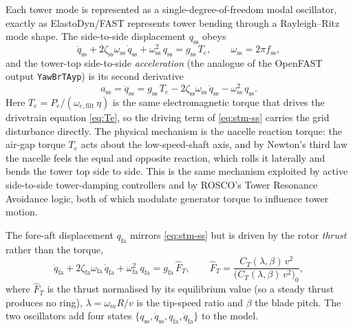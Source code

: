 Each tower mode is represented as a single-degree-of-freedom modal oscillator,
exactly as ElastoDyn/FAST represents tower bending through a Rayleigh--Ritz mode
shape. The side-to-side displacement \(q_{\mathrm{ss}}\) obeys
\begin{equation}
  \ddot{q}_{\mathrm{ss}}
    + 2\zeta_{\mathrm{ss}}\omega_{\mathrm{ss}}\,\dot{q}_{\mathrm{ss}}
    + \omega_{\mathrm{ss}}^2\,q_{\mathrm{ss}}
  = g_{\mathrm{ss}}\,T_e,
  \qquad \omega_{\mathrm{ss}} = 2\pi f_{\mathrm{ss}},
  \label{eq:stm-ss}
\end{equation}
and the tower-top side-to-side \emph{acceleration} (the analogue of the OpenFAST
output \texttt{YawBrTAyp}) is its second derivative
\begin{equation}
  a_{\mathrm{ss}} = \ddot{q}_{\mathrm{ss}}
    = g_{\mathrm{ss}}\,T_e
      - 2\zeta_{\mathrm{ss}}\omega_{\mathrm{ss}}\,\dot{q}_{\mathrm{ss}}
      - \omega_{\mathrm{ss}}^2\,q_{\mathrm{ss}}.
  \label{eq:stm-ss-accel}
\end{equation}
Here \(T_e = P_e/(\omega_{e,\mathrm{filt}}\,\eta)\) is the same electromagnetic
torque that drives the drivetrain equation \eqref{eq:Te}, so the driving term of
\eqref{eq:stm-ss} carries the grid disturbance directly. The physical mechanism
is the nacelle reaction torque: the air-gap torque \(T_e\) acts about the
low-speed-shaft axis, and by Newton's third law the nacelle feels the equal and
opposite reaction, which rolls it laterally and bends the tower top side to side.
This is the same mechanism exploited by active side-to-side tower-damping
controllers and by ROSCO's Tower Resonance Avoidance logic, both of which
modulate generator torque to influence tower motion.

The fore-aft displacement \(q_{\mathrm{fa}}\) mirrors \eqref{eq:stm-ss} but is
driven by the rotor \emph{thrust} rather than the torque,
\begin{equation}
  \ddot{q}_{\mathrm{fa}}
    + 2\zeta_{\mathrm{fa}}\omega_{\mathrm{fa}}\,\dot{q}_{\mathrm{fa}}
    + \omega_{\mathrm{fa}}^2\,q_{\mathrm{fa}}
  = g_{\mathrm{fa}}\,\hat{F}_T,
  \qquad
  \hat{F}_T = \frac{C_T(\lambda,\beta)\,v^2}
                   {\big(C_T(\lambda,\beta)\,v^2\big)_0},
  \label{eq:stm-fa}
\end{equation}
where \(\hat{F}_T\) is the thrust normalised by its equilibrium value (so a
steady thrust produces no ring), \(\lambda = \omega_m R/v\) is the tip-speed
ratio and \(\beta\) the blade pitch. The two oscillators add four states
\(\{q_{\mathrm{ss}},\dot{q}_{\mathrm{ss}},q_{\mathrm{fa}},\dot{q}_{\mathrm{fa}}\}\)
to the model.

